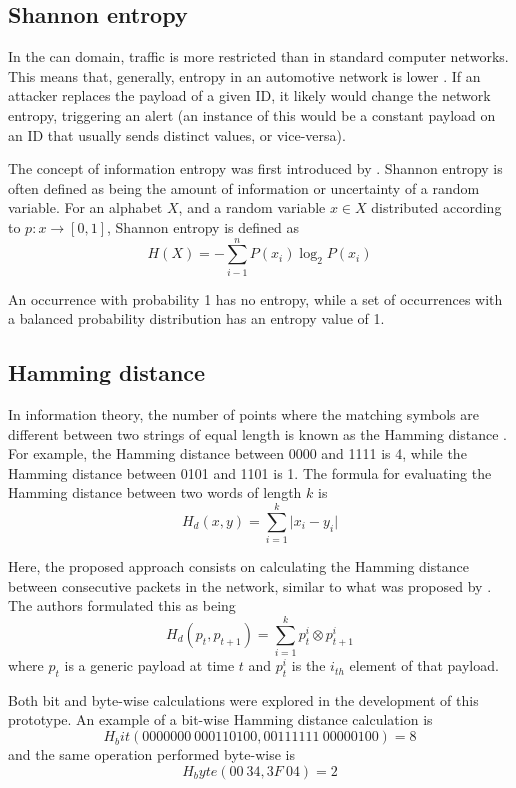 \subsection{Shannon entropy}

In the \gls{can} domain, traffic is more restricted than in standard computer networks. This means that, generally, entropy in an automotive network is lower \citep{muter2011entropy}. If an attacker replaces the payload of a given ID, it likely would change the network entropy, triggering an alert (an instance of this would be a constant payload on an ID that usually sends distinct values, or vice-versa).\par
The concept of information entropy was first introduced by \cite{shannon1948}. Shannon entropy is often defined as being the amount of information or uncertainty of a random variable. For an alphabet $X$, and a random variable $x \in X$ distributed according to $p: x \rightarrow [0, 1]$, Shannon entropy is defined as \[H(X) = - \sum_{i - 1}^{n} P(x_i) \log_2 P(x_i)\]\par
An occurrence with probability 1 has no entropy, while a set of occurrences with a balanced probability distribution has an entropy value of 1. 

\subsection{Hamming distance}

In information theory, the number of points where the matching symbols are different between two strings of equal length is known as the Hamming distance \citep{hamming1950}. For example, the Hamming distance between 0000 and 1111 is 4, while the Hamming distance between 0101 and 1101 is 1. The formula for evaluating the Hamming distance between two words of length $k$ is \[H_d(x, y) = \sum_{i = 1}^{k} \vert x_i - y_i \vert\]\par

Here, the proposed approach consists on calculating the Hamming distance between consecutive packets in the network, similar to what was proposed by \cite{stabili2017}. The authors formulated this as being \[H_d(p_t, p_{t + 1}) = \sum_{i = 1}^{k} p_{t}^{i} \otimes p_{t + 1}^{i}\] where $p_t$ is a generic payload at time $t$ and $p_t^i$ is the $i_{th}$ element of that payload.

Both bit and byte-wise calculations were explored in the development of this prototype. An example of a bit-wise Hamming distance calculation is \[H_bit(0000000\ 000110100, 00111111\ 00000100) = 8\]
and the same operation performed byte-wise is \[H_byte(00\ 34, 3F\ 04) = 2\]

